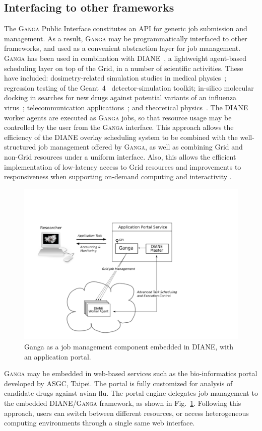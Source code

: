 \documentclass{elsart}
\def\ganga {\textsc{Ganga}\xspace}
\def\diane {\textsc{DIANE}\xspace}
\def\grid {Grid\xspace}
\begin{document}
\begin{linenumbers}
\section{Interfacing to other frameworks}
\label{sec:GangaInOtherFrameworks}
The \ganga Public Interface constitutes an API for generic job submission
and management.  As a result, \ganga may be programmatically
interfaced to other frameworks, and used as a convenient abstraction layer for
job management. \ganga has been used in combination with \diane~\cite{DIANE},
a lightweight agent-based
scheduling layer on top of the \grid, in a number
of scientific activities.  These have included: dosimetry-related simulation
studies in medical physics~\cite{Geant4MedicalDIANE}; regression testing of the Geant~4~\cite{Geant4}
detector-simulation toolkit;
in-silico molecular docking in searches for 
new drugs against potential variants of an influenza virus~\cite{AvianFlu};
telecommunication applications~\cite{ITU}; and theoretical physics~\cite{LQCD}. The
\diane worker agents are executed as \ganga jobs, so that resource usage
may be controlled by the user from the \ganga interface. This
approach allows the efficiency of the \diane overlay scheduling system
to be combined with the well-structured job management offered by \ganga, as well as
combining \grid and non-\grid resources under a uniform interface. 
Also, this allows the efficient implementation of low-latency access to \grid resources and improvements to responsiveness when supporting on-demand computing and interactivity \cite{SchedulingForResponsiveGrids}.

\begin{figure}[h!]
  \centering
  \includegraphics[width=1 \textwidth]{ganga-diane-portal}
  \caption{Ganga as a job management component embedded in \diane,
    with an application portal.}
  \label{fig:webportal}
\end{figure}
\ganga may be embedded in web-based services such as the
bio-informatics portal developed by ASGC, Taipei. The portal is fully
customized for analysis of candidate drugs against avian flu.  The portal
engine delegates
job management to the embedded \diane/\ganga framework, as shown in
Fig.~\ref{fig:webportal}. Following this approach, users can
switch between different resources, or access heterogeneous computing environments
through a single same web interface.


\end{linenumbers}
\end{document}
